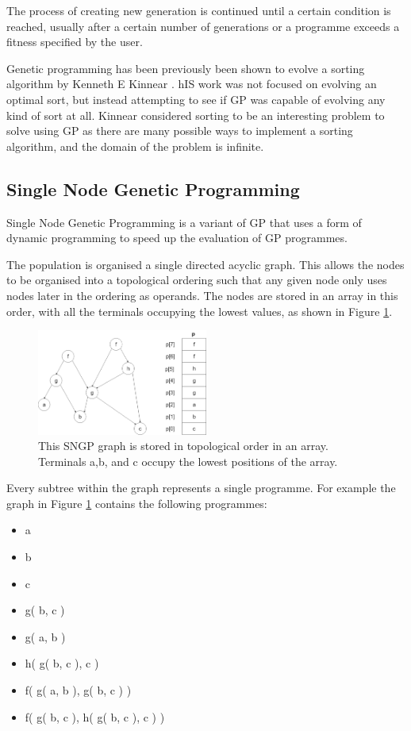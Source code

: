 \documentclass{article}
\begin{document}
	The process of creating new generation is continued until a certain condition is reached, usually after a certain number of generations or a programme exceeds a fitness specified by the user.
	
	Genetic programming has been previously been shown to evolve a sorting algorithm by Kenneth E Kinnear \cite{kinnear_generality_1993,kinnear_evolving_1993}. hIS work was not focused on evolving an optimal sort, but instead attempting to see if GP was capable of evolving any kind of sort at all. Kinnear considered sorting to be an interesting problem to solve using GP as there are many possible ways to implement a sorting algorithm, and the domain of the problem is infinite.
	
	\subsection{Single Node Genetic Programming}
	
	Single Node Genetic Programming is a variant of GP that uses a form of dynamic programming to speed up the evaluation of GP programmes.
	
	The population is organised a single directed acyclic graph. This allows the nodes to be organised into a topological ordering such that any given node only uses nodes later in the ordering as operands. The nodes are stored in an array in this order, with all the terminals occupying the lowest values, as shown in Figure \ref{fig:sngp_graph}.
	
	\begin{figure}[h]
		\centering
		\includegraphics[width=0.5\textwidth]{8_sngp_graph}
		\caption{This SNGP graph is stored in topological order in an array. Terminals a,b, and c occupy the lowest positions of the array.}
		\label{fig:sngp_graph}
	\end{figure}
	
	Every subtree within the graph represents a single programme. For example the graph in Figure \ref{fig:sngp_graph} contains the following programmes:
	
	\begin{multicols}{2}
		\begin{itemize}
			\item a
			\item b
			\item c
			\item g( b, c )
			\item g( a, b )
			\item h( g( b, c ), c )
			\item f( g( a, b ), g( b, c ) )
			\item f( g( b, c ), h( g( b, c ), c ) )
		\end{itemize}
	\end{multicols}
	
\end{document}
